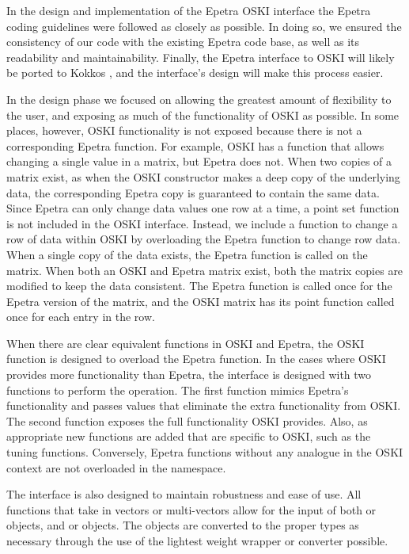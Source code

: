In the design and implementation of the Epetra OSKI interface
the Epetra coding guidelines \cite{IK:Epetra-coding}
were followed as closely as possible.  In doing so, we ensured the consistency of 
our code with the existing Epetra code base, as well as its readability and maintainability.
Finally, the Epetra interface to OSKI
will likely be ported to Kokkos \cite{IK:Kokkos-site}, and the interface's design will make
this process easier.

In the design phase we focused on allowing the greatest amount of flexibility to the user,
and exposing as much of the functionality of OSKI as possible.  In some places, however, OSKI
functionality is not exposed because there is not a corresponding Epetra function.
For example, OSKI has a function that allows changing a 
single value in a matrix, but Epetra does not.  When two copies of a matrix exist, as when the
OSKI constructor makes a deep copy of the underlying data, the corresponding Epetra copy is 
guaranteed to contain the same data.  Since Epetra can only change data values one row at a time,
a point set function is not included in the OSKI interface.  Instead, we include a function
to change a row of data within OSKI by overloading the Epetra function to change row data.  When a
single copy of the data exists, the Epetra function is called on the matrix.
When both an OSKI and Epetra matrix exist, both the matrix copies are modified to keep the data
consistent.  The Epetra function is called once for the Epetra version of the matrix,
and the OSKI matrix has its point function called once for each entry in the row.

When there are clear equivalent functions in OSKI and Epetra, the OSKI function is designed to
overload the Epetra function.  In the cases where OSKI provides more functionality than Epetra, the interface is designed with 
two functions to perform the operation.  The first function mimics Epetra's functionality and passes
values that eliminate the extra functionality from OSKI.  The second function exposes the
full functionality OSKI provides.  Also, as appropriate new functions are added that are
specific to OSKI, such as the tuning functions.  Conversely, Epetra functions without any analogue in the OSKI
context are not overloaded in the  namespace.  

The interface is also designed to maintain robustness and ease of use.  All \newline {}
functions that take in vectors or multi-vectors allow for the input of both  or 
 objects, and  or 
objects.  The objects are converted to the proper types as necessary through the
use of the lightest weight wrapper or converter possible.

